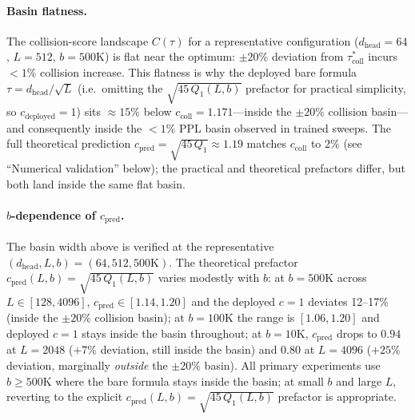 \paragraph{Basin flatness.} The collision-score landscape $C(\tau)$ for a representative configuration ($d_{\mathrm{head}}{=}64$, $L{=}512$, $b{=}500\mathrm{K}$) is flat near the optimum: ${\pm}20\%$ deviation from $\tau^*_{\mathrm{coll}}$ incurs ${<}1\%$ collision increase. This flatness is why the deployed bare formula $\tau = d_{\mathrm{head}}/\sqrt{L}$ (i.e.\ omitting the $\sqrt{45\,Q_1(L,b)}$ prefactor for practical simplicity, so $c_{\mathrm{deployed}}{=}1$) sits ${\approx}15\%$ below $c_{\mathrm{coll}}{=}1.171$---inside the ${\pm}20\%$ collision basin---and consequently inside the ${<}1\%$ PPL basin observed in trained sweeps. The full theoretical prediction $c_{\mathrm{pred}}{=}\sqrt{45\,Q_1}{\approx}1.19$ matches $c_{\mathrm{coll}}$ to $2\%$ (see ``Numerical validation'' below); the practical and theoretical prefactors differ, but both land inside the same flat basin.

\paragraph{$b$-dependence of $c_{\mathrm{pred}}$.} The basin width above is verified at the representative $(d_{\mathrm{head}},L,b){=}(64,512,500\mathrm{K})$. The theoretical prefactor $c_{\mathrm{pred}}(L,b){=}\sqrt{45\,Q_1(L,b)}$ varies modestly with $b$: at $b{=}500\mathrm{K}$ across $L{\in}[128,4096]$, $c_{\mathrm{pred}}{\in}[1.14,1.20]$ and the deployed $c{=}1$ deviates 12--17\% (inside the ${\pm}20\%$ collision basin); at $b{=}100\mathrm{K}$ the range is $[1.06,1.20]$ and deployed $c{=}1$ stays inside the basin throughout; at $b{=}10\mathrm{K}$, $c_{\mathrm{pred}}$ drops to $0.94$ at $L{=}2048$ ($+7\%$ deviation, still inside the basin) and $0.80$ at $L{=}4096$ ($+25\%$ deviation, marginally \emph{outside} the ${\pm}20\%$ basin). All primary experiments use $b{\geq}500\mathrm{K}$ where the bare formula stays inside the basin; at small $b$ and large $L$, reverting to the explicit $c_{\mathrm{pred}}(L,b){=}\sqrt{45\,Q_1(L,b)}$ prefactor is appropriate.

